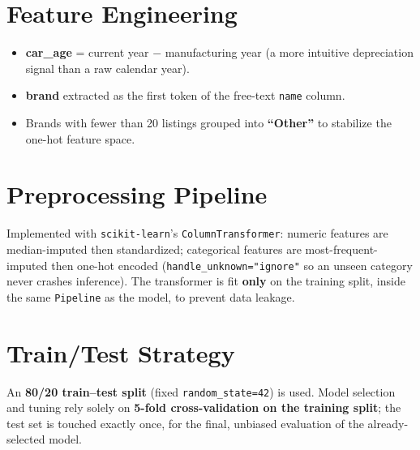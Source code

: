 \documentclass[12pt,a4paper]{report}
\begin{document}
\section*{Feature Engineering}
\begin{itemize}[nosep]
    \item \textbf{car\_age} = current year $-$ manufacturing year (a more intuitive depreciation signal than a raw calendar year).
    \item \textbf{brand} extracted as the first token of the free-text \texttt{name} column.
    \item Brands with fewer than 20 listings grouped into \textbf{``Other''} to stabilize the one-hot feature space.
\end{itemize}

\section*{Preprocessing Pipeline}
Implemented with \texttt{scikit-learn}'s \texttt{ColumnTransformer}:
numeric features are median-imputed then standardized; categorical
features are most-frequent-imputed then one-hot encoded
(\texttt{handle\_unknown="ignore"} so an unseen category never crashes
inference). The transformer is fit \textbf{only} on the training split,
inside the same \texttt{Pipeline} as the model, to prevent data leakage.

\section*{Train/Test Strategy}
An \textbf{80/20 train--test split} (fixed \texttt{random\_state=42}) is
used. Model selection and tuning rely solely on \textbf{5-fold
cross-validation on the training split}; the test set is touched exactly
once, for the final, unbiased evaluation of the already-selected model.
\end{document}
